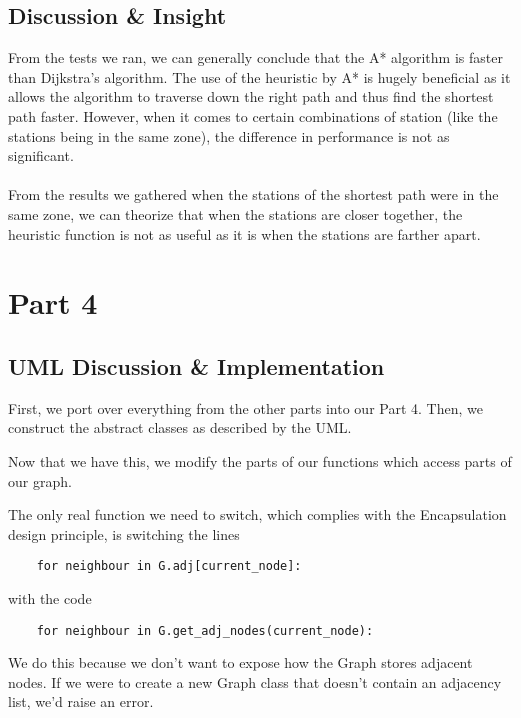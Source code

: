\documentclass{article}
\begin{document}
\subsection{Discussion \& Insight}

From the tests we ran, we can generally conclude that the A* algorithm is faster than Dijkstra’s algorithm. The use of the heuristic by A* is hugely beneficial as it allows the algorithm to traverse down the right path and thus find the shortest path faster. However, when it comes to certain combinations of station (like the stations being in the same zone), the difference in performance is not as significant. \\
\\
From the results we gathered when the stations of the shortest path were in the same zone, we can theorize that when the stations are closer together, the heuristic function is not as useful as it is when the stations are farther apart.\\

\newpage
\section{Part 4}
\subsection{UML Discussion \& Implementation}

First, we port over everything from the other parts into our Part 4. Then, we construct the abstract classes as described by the UML.

Now that we have this, we modify the parts of our functions which access parts of our graph.

The only real function we need to switch, which complies with the Encapsulation design principle, is switching the lines

\begin{verbatim}
    for neighbour in G.adj[current_node]:
\end{verbatim}

with the code

\begin{verbatim}
    for neighbour in G.get_adj_nodes(current_node):
\end{verbatim}

We do this because we don't want to expose how the Graph stores adjacent nodes. If we were to create a new Graph class that doesn't contain an adjacency list, we'd raise an error.
\end{document}
